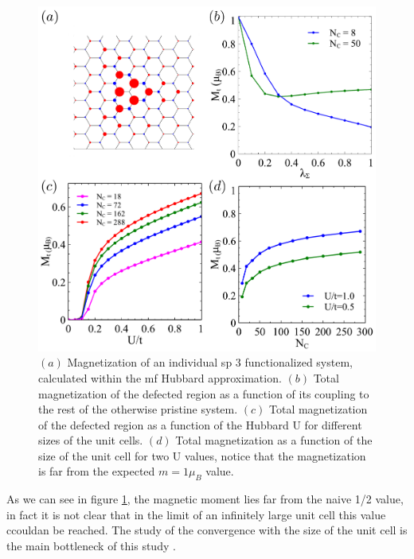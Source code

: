 \begin{figure}[h!]
\centering
\includegraphics{chapter05/figures/figMF.pdf}
\vspace{-5pt}
\caption{$(a)$ Magnetization of an individual sp 3 functionalized system, calculated within the \ac{mf} Hubbard approximation. $(b)$ Total magnetization of the defected region as a function of its coupling to the rest of the otherwise pristine system. $(c)$ Total magnetization of the defected region as a function of the Hubbard U for different sizes of the unit cells. $(d)$ Total magnetization as a function of the size of the unit cell for two U values, notice that the magnetization is far from the expected $m = 1\mu_B$ value.}
\label{meanfield}
\end{figure}
\FloatBarrier
As we can see in figure \ref{meanfield}, the magnetic moment lies far from the naive 1/2 value, in fact it is not clear that in the limit of an infinitely large unit cell this value ccouldan be reached.
The study of the convergence with the size of the unit cell is the main bottleneck of this study .

